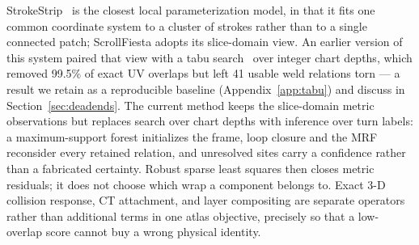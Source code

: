 StrokeStrip~\cite{pagurek2021strokestrip} is the closest local parameterization model, in that it fits one common coordinate system to a cluster of strokes rather than to a single connected patch; ScrollFiesta adopts its slice-domain view. An earlier version of this system paired that view with a tabu search~\cite{glover1989tabu} over integer chart depths, which removed 99.5\% of exact UV overlaps but left 41 usable weld relations torn --- a result we retain as a reproducible baseline (Appendix~\ref{app:tabu}) and discuss in Section~\ref{sec:deadends}. The current method keeps the slice-domain metric observations but replaces search over chart depths with inference over turn labels: a maximum-support forest initializes the frame, loop closure and the MRF reconsider every retained relation, and unresolved sites carry a confidence rather than a fabricated certainty. Robust sparse least squares then closes metric residuals; it does not choose which wrap a component belongs to. Exact 3-D collision response, CT attachment, and layer compositing are separate operators rather than additional terms in one atlas objective, precisely so that a low-overlap score cannot buy a wrong physical identity.
